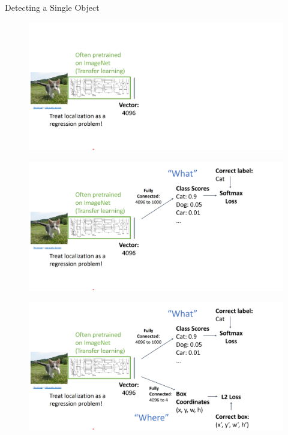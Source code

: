 \documentclass[10pt]{beamer}
\theoremstyle{remark}
\theoremstyle{definition}
\begin{document}
\begin{frame}[allowframebreaks]{Detecting a Single Object}
\begin{figure}
\centering
\includegraphics[width=1.0\textwidth,height=1.0\textheight,keepaspectratio]{./images/object_3.png}
\end{figure}

\framebreak

\begin{figure}
\centering
\includegraphics[width=1.0\textwidth,height=1.0\textheight,keepaspectratio]{./images/object_4.png}
\end{figure}

\framebreak

\begin{figure}
\centering
\includegraphics[width=1.0\textwidth,height=1.0\textheight,keepaspectratio]{./images/object_5.png}
\end{figure}


\end{frame}
\end{document}
